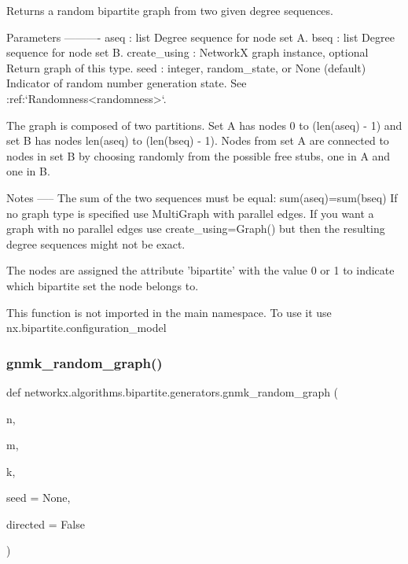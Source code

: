 \begin{DoxyVerb}Returns a random bipartite graph from two given degree sequences.

Parameters
----------
aseq : list
   Degree sequence for node set A.
bseq : list
   Degree sequence for node set B.
create_using : NetworkX graph instance, optional
   Return graph of this type.
seed : integer, random_state, or None (default)
    Indicator of random number generation state.
    See :ref:`Randomness<randomness>`.

The graph is composed of two partitions. Set A has nodes 0 to
(len(aseq) - 1) and set B has nodes len(aseq) to (len(bseq) - 1).
Nodes from set A are connected to nodes in set B by choosing
randomly from the possible free stubs, one in A and one in B.

Notes
-----
The sum of the two sequences must be equal: sum(aseq)=sum(bseq)
If no graph type is specified use MultiGraph with parallel edges.
If you want a graph with no parallel edges use create_using=Graph()
but then the resulting degree sequences might not be exact.

The nodes are assigned the attribute 'bipartite' with the value 0 or 1
to indicate which bipartite set the node belongs to.

This function is not imported in the main namespace.
To use it use nx.bipartite.configuration_model
\end{DoxyVerb}
 \mbox{\label{namespacenetworkx_1_1algorithms_1_1bipartite_1_1generators_a60074590da46e3abdef5456048742e31}} 
\subsubsection{\texorpdfstring{gnmk\+\_\+random\+\_\+graph()}{gnmk\_random\_graph()}}
{\footnotesize\ttfamily def networkx.\+algorithms.\+bipartite.\+generators.\+gnmk\+\_\+random\+\_\+graph (\begin{DoxyParamCaption}\item[{}]{n,  }\item[{}]{m,  }\item[{}]{k,  }\item[{}]{seed = {\ttfamily None},  }\item[{}]{directed = {\ttfamily False} }\end{DoxyParamCaption})}

